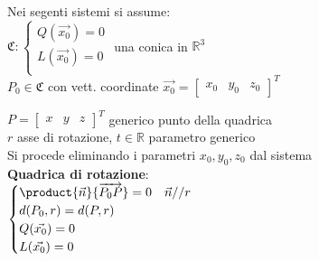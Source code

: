Nei segenti sistemi si assume: \\
$\mathfrak{C}:
\begin{cases}
	Q(\vec{x_{0}})=0 \\
	L(\vec{x_{0}})=0 \\
\end{cases}$
una conica in $\mathbb{R}^3$ \\

$P_0 \in \mathfrak{C}$ con vett. coordinate
$\vec{x_0}=\begin{bmatrix}x_0 & y_0 & z_0\end{bmatrix}^T$

$P=\begin{bmatrix}x & y & z\end{bmatrix}^T$ generico punto della quadrica \\

$r$ asse di rotazione, $t\in \mathbb{R}$ parametro generico \\

Si procede eliminando i parametri $x_0 , y_0 , z_0$ dal sistema \\
\textbf{Quadrica di rotazione}: \\
$\begin{cases}
	\product{\vec{n}}{\overrightarrow{P_{0}P}}=0 & \vec{n} // r \\
	d(P_{0},r)=d(P,r) \\
	Q(\vec{x_{0}})=0 \\
	L(\vec{x_{0}})=0 \\
\end{cases}$ \\
